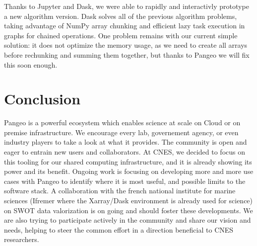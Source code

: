 \documentclass{article}
\begin{document}
Thanks to Jupyter and Dask, we were able to rapidly and interactivly prototype a new algorithm version. Dask solves all of the previous algorithm problems, taking advantage of NumPy array chunking and efficient lazy task execution in graphs for chained operations. One problem remains with our current simple solution: it does not optimize the memory usage, as we need to create all arrays before rechunking and summing them together, but thanks to Pangeo we will fix this soon enough.

\section{Conclusion}
\label{sec:conclusion}

Pangeo is a powerful ecosystem which enables science at scale on Cloud or on premise infrastructure. We encourage every lab, governement agency, or even industry players to take a look at what it provides. The community is open and eager to entrain new users and collaborators.
At CNES, we decided to focus on this tooling for our shared computing infrastructure, and it is already showing its power and its benefit. Ongoing work is focusing on developing more and more use cases with Pangeo to identify where it is most useful, and possible limits to the software stack. A collaboration with the french national institute for marine sciences (Ifremer where the Xarray/Dask environment is already used for science\cite{b9}) on SWOT data valorization is on going and should foster these developments. We are also trying to participate actively in the community and share our vision and needs, helping to steer the common effort in a direction beneficial to CNES researchers.







\small
\end{document}
